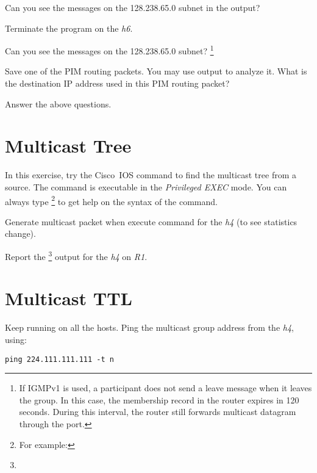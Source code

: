 \documentclass{../UTNetLab}
\begin{document}
    Can you see the  messages on the 128.238.65.0 subnet in the  output? 

    Terminate the  program on the \textit{h6}.

    Can you see the  messages on the 128.238.65.0 subnet?
    \footnote{If IGMPv1 is used, a participant does not send a leave message when it leaves the group.
    In this case, the membership record in the router expires in 120 seconds.
    During this interval, the router still forwards multicast datagram through the port.} 

    Save one of the PIM routing packets.
    You may use  output to analyze it.
    What is the destination IP address used in this PIM routing packet?
    
    \begin{report}
        \item Answer the above questions.
    \end{report}

\section{Multicast Tree}
    In this exercise, try the  Cisco~IOS command to find the multicast tree from a source.
    The  command is executable in the \textit{Privileged EXEC} mode.
    You can always type \footnote{For example: } to get help on the syntax of the command.

    Generate multicast packet when execute command for the \textit{h4} (to see statistics change).

    \begin{report}
        \item Report the \footnote{} output for the \textit{h4} on \textit{R1}.
    \end{report}

\section{Multicast TTL}
    Keep  running on all the hosts.
    Ping the multicast group address from the \textit{h4}, using: 
    \begin{lstlisting}[emph={n}]
ping 224.111.111.111 -t n
    \end{lstlisting}
\end{document}
